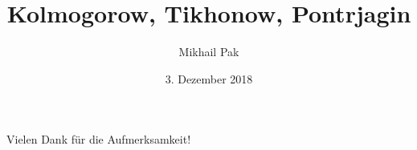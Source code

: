 \documentclass[11pt, ngerman]{beamer}
\title{Kolmogorow, Tikhonow, Pontrjagin}
\date{3. Dezember 2018}
\author{Mikhail Pak}
\institute{CC BY-NC-SA 4.0}
\begin{document}
  \maketitle

  

  \begin{frame}
    \centering
    Vielen Dank für die Aufmerksamkeit!
  \end{frame}
\end{document}
